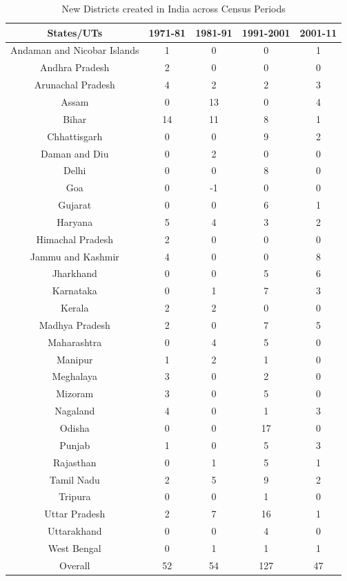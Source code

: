 \documentclass[12pt, a4paper]{article}
\begin{document}
	\begin{table}[h!]
		\centering
		\caption{New Districts created in India across Census Periods}
		\label{Fig1}
		\begin{tabular}{c|cccc} 
			\hline
			States/UTs & 1971-81 & 1981-91 & 1991-2001 & 2001-11 \\
			\hline 
			Andaman and Nicobar Islands & 1 & 0 & 0 & 1  \\ 
			Andhra Pradesh & 2 & 0 & 0 & 0  \\ 
			Arunachal Pradesh & 4 & 2 & 2 & 3  \\ 
			Assam & 0 & 13 & 0 & 4  \\ 
			Bihar & 14 & 11 & 8 & 1  \\ 
			Chhattisgarh & 0 & 0 & 9 & 2  \\ 
			Daman and Diu & 0 & 2 & 0 & 0  \\ 
			Delhi & 0 & 0 & 8 & 0  \\ 
			Goa & 0 & -1 & 0 & 0  \\ 
			Gujarat & 0 & 0 & 6 & 1  \\ 
			Haryana & 5 & 4 & 3 & 2  \\ 
			Himachal Pradesh & 2 & 0 & 0 & 0  \\ 
			Jammu and Kashmir & 4 & 0 & 0 & 8  \\ 
			Jharkhand & 0 & 0 & 5 & 6  \\ 
			Karnataka & 0 & 1 & 7 & 3  \\ 
			Kerala & 2 & 2 & 0 & 0  \\ 
			Madhya Pradesh & 2 & 0 & 7 & 5  \\ 
			Maharashtra & 0 & 4 & 5 & 0  \\ 
			Manipur & 1 & 2 & 1 & 0  \\ 
			Meghalaya & 3 & 0 & 2 & 0  \\ 
			Mizoram & 3 & 0 & 5 & 0  \\ 
			Nagaland & 4 & 0 & 1 & 3  \\ 
			Odisha & 0 & 0 & 17 & 0  \\ 
			Punjab & 1 & 0 & 5 & 3  \\ 
			Rajasthan & 0 & 1 & 5 & 1  \\ 
			Tamil Nadu & 2 & 5 & 9 & 2  \\ 
			Tripura & 0 & 0 & 1 & 0  \\ 
			Uttar Pradesh & 2 & 7 & 16 & 1  \\ 
			Uttarakhand & 0 & 0 & 4 & 0  \\ 
			West Bengal & 0 & 1 & 1 & 1  \\ 
			\hline
			Overall & 52 & 54 & 127 & 47  \\ 
			\hline
		\end{tabular}
	\end{table} 
	
\end{document}
